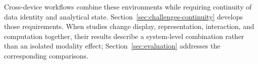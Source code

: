 Cross-device workflows combine these environments while requiring continuity of data identity and analytical state. Section~\ref{sec:challenges-continuity} develops those requirements. When studies change display, representation, interaction, and computation together, their results describe a system-level combination rather than an isolated modality effect; Section~\ref{sec:evaluation} addresses the corresponding comparisons.
